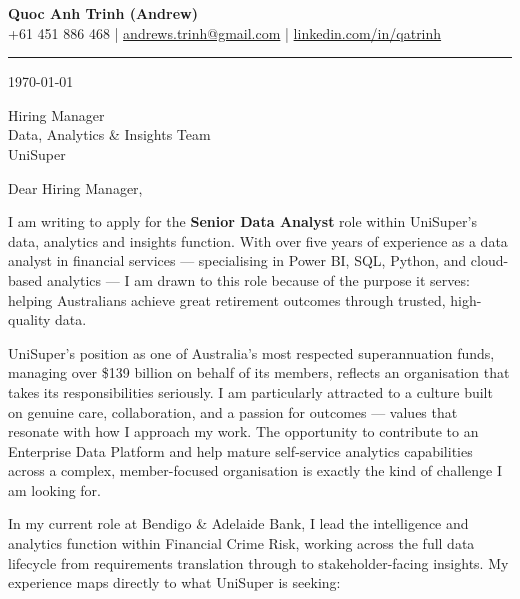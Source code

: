 \documentclass[11pt, a4paper]{article}
\begin{document}
\begin{center}
    {\LARGE \textbf{Quoc Anh Trinh (Andrew)}}\\[4pt]
    {\small
        +61 451 886 468 \quad|\quad
        \href{mailto:andrews.trinh@gmail.com}{andrews.trinh@gmail.com} \quad|\quad
        \href{https://www.linkedin.com/in/qatrinh}{linkedin.com/in/qatrinh}
    }
\end{center}

\vspace{4pt}
\hrule
\vspace{14pt}

\today

\vspace{8pt}

Hiring Manager\\
Data, Analytics \& Insights Team\\
UniSuper

\vspace{10pt}

Dear Hiring Manager,

I am writing to apply for the \textbf{Senior Data Analyst} role within UniSuper's data, analytics and insights function. With over five years of experience as a data analyst in financial services --- specialising in Power BI, SQL, Python, and cloud-based analytics --- I am drawn to this role because of the purpose it serves: helping Australians achieve great retirement outcomes through trusted, high-quality data.

UniSuper's position as one of Australia's most respected superannuation funds, managing over \$139 billion on behalf of its members, reflects an organisation that takes its responsibilities seriously. I am particularly attracted to a culture built on genuine care, collaboration, and a passion for outcomes --- values that resonate with how I approach my work. The opportunity to contribute to an Enterprise Data Platform and help mature self-service analytics capabilities across a complex, member-focused organisation is exactly the kind of challenge I am looking for.

In my current role at Bendigo \& Adelaide Bank, I lead the intelligence and analytics function within Financial Crime Risk, working across the full data lifecycle from requirements translation through to stakeholder-facing insights. My experience maps directly to what UniSuper is seeking:
\end{document}
